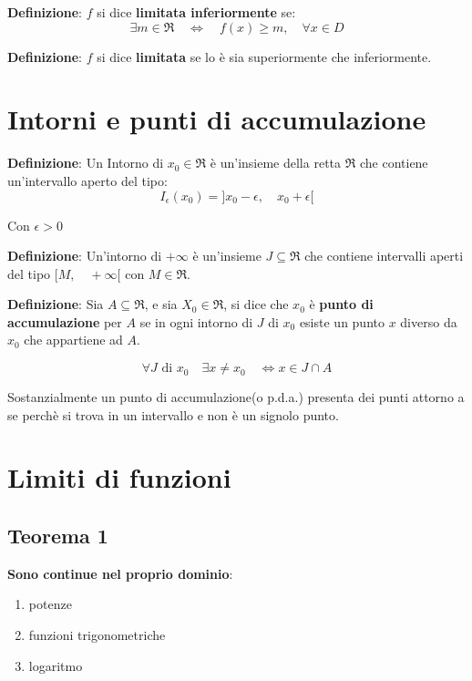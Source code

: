 \documentclass{article}
\begin{document}
\textbf{Definizione}:
$f$ si dice \textbf{limitata inferiormente} se:
\begin{equation*}
    \exists m \in \Re \quad \Leftrightarrow \quad f(x) \geq m, \quad \forall x \in D
\end{equation*}

\textbf{Definizione}:
$f$ si dice \textbf{limitata} se lo è sia superiormente che inferiormente.

\section{Intorni e punti di accumulazione}

\textbf{Definizione}:
Un Intorno di $x_0 \in \Re$ è un'insieme della retta $\Re$ che contiene un'intervallo aperto del tipo:
\begin{equation*}
    I_\epsilon (x_0) = ] x_0 - \epsilon, \quad x_0 + \epsilon [
\end{equation*}

Con $\epsilon > 0$

\textbf{Definizione}:
Un'intorno di $+\infty$ è un'insieme $J \subseteq \Re$ che contiene intervalli aperti
del tipo $[M, \quad +\infty[$ con $M \in \Re$.

\textbf{Definizione}:
Sia $A \subseteq \Re$, e sia $X_0 \in \Re$, si dice che $x_0$ è \textbf{punto di accumulazione}
per $A$ se in ogni intorno di $J$ di $x_0$ esiste un punto $x$ diverso da $x_0$
che appartiene ad $A$.

\begin{equation*}
    \forall J \text{ di } x_0 \quad \exists x \neq x_0 \quad \Leftrightarrow x \in J \cap A
\end{equation*}

Sostanzialmente un punto di accumulazione(o p.d.a.) presenta dei punti attorno a se perchè si trova in un intervallo e non è un signolo punto.

\section{Limiti di funzioni}
\subsection{Teorema 1}
\textbf{Sono continue nel proprio dominio}:
\begin{enumerate}
    \item potenze
    \item funzioni trigonometriche
    \item logaritmo
\end{enumerate}
\end{document}

